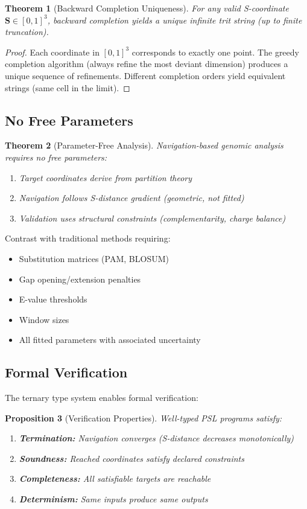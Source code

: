 \documentclass[twocolumn,10pt]{article}
\newtheorem{theorem}{Theorem}[section]
\newtheorem{proposition}[theorem]{Proposition}
\theoremstyle{remark}
\newcommand{\Scoord}{\mathbf{S}}
\begin{document}
\begin{theorem}[Backward Completion Uniqueness]
For any valid S-coordinate $\Scoord \in [0,1]^3$, backward completion yields a unique infinite trit string (up to finite truncation).
\end{theorem}

\begin{proof}
Each coordinate in $[0,1]^3$ corresponds to exactly one point. The greedy completion algorithm (always refine the most deviant dimension) produces a unique sequence of refinements. Different completion orders yield equivalent strings (same cell in the limit).
\end{proof}

\subsection{No Free Parameters}

\begin{theorem}[Parameter-Free Analysis]
Navigation-based genomic analysis requires no free parameters:
\begin{enumerate}
\item Target coordinates derive from partition theory
\item Navigation follows S-distance gradient (geometric, not fitted)
\item Validation uses structural constraints (complementarity, charge balance)
\end{enumerate}
\end{theorem}

Contrast with traditional methods requiring:
\begin{itemize}
\item Substitution matrices (PAM, BLOSUM)
\item Gap opening/extension penalties
\item E-value thresholds
\item Window sizes
\item All fitted parameters with associated uncertainty
\end{itemize}

\subsection{Formal Verification}

The ternary type system enables formal verification:

\begin{proposition}[Verification Properties]
Well-typed PSL programs satisfy:
\begin{enumerate}
\item \textbf{Termination:} Navigation converges (S-distance decreases monotonically)
\item \textbf{Soundness:} Reached coordinates satisfy declared constraints
\item \textbf{Completeness:} All satisfiable targets are reachable
\item \textbf{Determinism:} Same inputs produce same outputs
\end{enumerate}
\end{proposition}
\end{document}
